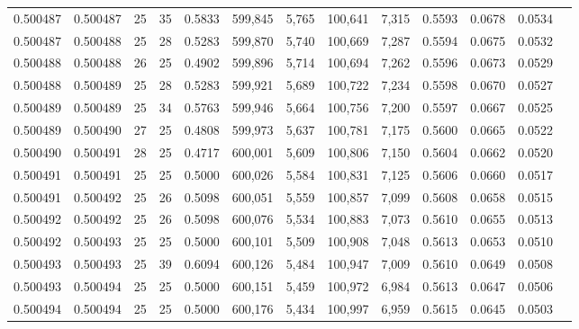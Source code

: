 \begin{tabular}{rrrrrrrrrrrrr}
0.500487 & 0.500487 &    25 &  35 &                                     0.5833 & 599,845 &   5,765 & 100,641 &   7,315 & 0.5593 & 0.0678 & 0.0534 \\
0.500487 & 0.500488 &    25 &  28 &                                     0.5283 & 599,870 &   5,740 & 100,669 &   7,287 & 0.5594 & 0.0675 & 0.0532 \\
0.500488 & 0.500488 &    26 &  25 &                                     0.4902 & 599,896 &   5,714 & 100,694 &   7,262 & 0.5596 & 0.0673 & 0.0529 \\
0.500488 & 0.500489 &    25 &  28 &                                     0.5283 & 599,921 &   5,689 & 100,722 &   7,234 & 0.5598 & 0.0670 & 0.0527 \\
0.500489 & 0.500489 &    25 &  34 &                                     0.5763 & 599,946 &   5,664 & 100,756 &   7,200 & 0.5597 & 0.0667 & 0.0525 \\
0.500489 & 0.500490 &    27 &  25 &                                     0.4808 & 599,973 &   5,637 & 100,781 &   7,175 & 0.5600 & 0.0665 & 0.0522 \\
0.500490 & 0.500491 &    28 &  25 &                                     0.4717 & 600,001 &   5,609 & 100,806 &   7,150 & 0.5604 & 0.0662 & 0.0520 \\
0.500491 & 0.500491 &    25 &  25 &                                     0.5000 & 600,026 &   5,584 & 100,831 &   7,125 & 0.5606 & 0.0660 & 0.0517 \\
0.500491 & 0.500492 &    25 &  26 &                                     0.5098 & 600,051 &   5,559 & 100,857 &   7,099 & 0.5608 & 0.0658 & 0.0515 \\
0.500492 & 0.500492 &    25 &  26 &                                     0.5098 & 600,076 &   5,534 & 100,883 &   7,073 & 0.5610 & 0.0655 & 0.0513 \\
0.500492 & 0.500493 &    25 &  25 &                                     0.5000 & 600,101 &   5,509 & 100,908 &   7,048 & 0.5613 & 0.0653 & 0.0510 \\
0.500493 & 0.500493 &    25 &  39 &                                     0.6094 & 600,126 &   5,484 & 100,947 &   7,009 & 0.5610 & 0.0649 & 0.0508 \\
0.500493 & 0.500494 &    25 &  25 &                                     0.5000 & 600,151 &   5,459 & 100,972 &   6,984 & 0.5613 & 0.0647 & 0.0506 \\
0.500494 & 0.500494 &    25 &  25 &                                     0.5000 & 600,176 &   5,434 & 100,997 &   6,959 & 0.5615 & 0.0645 & 0.0503 \\

\end{tabular}
